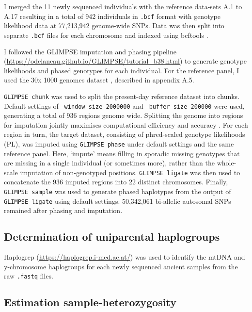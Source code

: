 I merged the 11 newly sequenced individuals with the reference data-sets A.1 to A.17 resulting in a total of 942 individuals in \texttt{.bcf} format with genotype likelihood data at 77,213,942 genome-wide SNPs. Data was then split into separate \texttt{.bcf} files for each chromosome and indexed using bcftools \cite{li2009sequence}.

I followed the GLIMPSE \cite{rubinacci2021efficient} imputation and phasing pipeline (\url{https://odelaneau.github.io/GLIMPSE/tutorial_b38.html}) to generate genotype likelihoods and phased genotypes for each individual. For the reference panel, I used the 30x 1000 genomes dataset \cite{byrska2021high}, described in appendix A.5.  

\texttt{GLIMPSE chunk} was used to split the present-day reference dataset into chunks. Default settings of \texttt{--window-size 2000000} and \texttt{--buffer-size 200000} were used, generating a total of 936 regions genome wide. Splitting the genome into regions for imputation jointly maximises computational efficiency and accuracy \cite{rubinacci2021efficient}. For each region in turn, the target dataset, consisting of phred-scaled genotype likelihoods (PL), was imputed using \texttt{GLIMPSE phase} under default settings and the same reference panel. Here, `impute' means filling in sporadic missing genotypes that are missing in a single individual (or sometimes more), rather than the whole-scale imputation of non-genotyped positions. \texttt{GLIMPSE ligate} was then used to concatenate the 936 imputed regions into 22 distinct chromosomes. Finally, \texttt{GLIMPSE sample} was used to generate phased haplotypes from the output of \texttt{GLIMPSE ligate} using default settings. 50,342,061 bi-allelic autosomal SNPs remained after phasing and imputation. 

\subsection{Determination of uniparental haplogroups}

Haplogrep (\url{https://haplogrep.i-med.ac.at/}) was used to identify the mtDNA and y-chromosome haplogroups for each newly sequenced ancient samples \cite{weissensteiner2016haplogrep} from the raw \texttt{.fastq} files.

\subsection{Estimation sample-heterozygosity}

